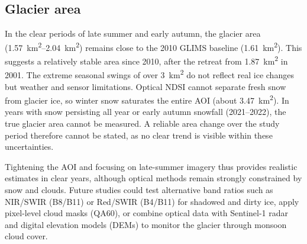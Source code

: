 \documentclass{article}
\begin{document}
\subsection{Glacier area}
In the clear periods of late summer and early autumn, the glacier area (\qtyrange{1.57}{2.04}{\km\squared}) remains close to the 2010 GLIMS baseline (\qty{1.61}{\km\squared}). This suggests a relatively stable area since 2010, after the retreat from \qty{1.87}{\km\squared} in 2001. The extreme seasonal swings of over \qty{3}{\km\squared} do not reflect real ice changes but weather and sensor limitations. Optical NDSI cannot separate fresh snow from glacier ice, so winter snow saturates the entire AOI (about \qty{3.47}{\km\squared}). In years with snow persisting all year or early autumn snowfall (2021--2022), the true glacier area cannot be measured. A reliable area change over the study period therefore cannot be stated, as no clear trend is visible within these uncertainties.

Tightening the AOI and focusing on late-summer imagery thus provides realistic estimates in clear years, although optical methods remain strongly constrained by snow and clouds. Future studies could test alternative band ratios such as NIR/SWIR (B8/B11) or Red/SWIR (B4/B11) for shadowed and dirty ice, apply pixel-level cloud masks (QA60), or combine optical data with Sentinel-1 radar and digital elevation models (DEMs) to monitor the glacier through monsoon cloud cover.
\end{document}

